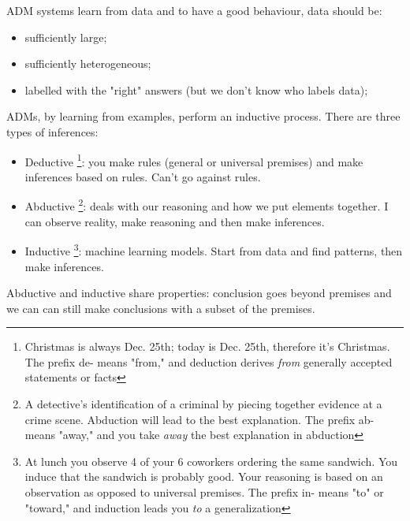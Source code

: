 ADM systems learn from data and to have a good behaviour, data should be:
\begin{itemize}
    \item sufficiently large;
    \item sufficiently heterogeneous;
    \item labelled with the "right" answers (but we don't know who labels data);
\end{itemize}
ADMs, by learning from examples, perform an inductive process. There are three types of inferences:
\begin{itemize}
    \item Deductive \footnote{Christmas is always Dec. 25th; today is Dec. 25th, therefore it’s Christmas. The prefix de- means "from," and deduction derives \textit{from} generally accepted statements or facts}: you make rules (general or universal premises) and make inferences based on rules. Can't go against rules. 
    \item Abductive \footnote{A detective's identification of a criminal by piecing together evidence at a crime scene. Abduction will lead to the best explanation. The prefix ab- means "away," and you take \textit{away} the best explanation in abduction}: deals with our reasoning and how we put elements together. I can observe reality, make reasoning and then make inferences. 
    \item Inductive \footnote{At lunch you observe 4 of your 6 coworkers ordering the same sandwich. You induce that the sandwich is probably good. Your reasoning is based on an observation as opposed to universal premises. The prefix in- means "to" or "toward," and induction leads you \textit{to} a generalization}: machine learning models. Start from data and find patterns, then make inferences. 
\end{itemize}
Abductive and inductive share properties: conclusion goes beyond premises and we can can still make conclusions with a subset of the premises.

